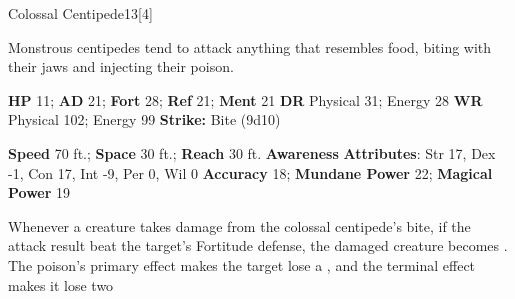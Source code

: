   
  \begin{monsection}{Colossal Centipede}{13}[4]
    \vspace{-1em}\vspace{-1em}
    \vspace{0em}

    
    Monstrous centipedes tend to attack anything that resembles food, biting with their jaws and injecting their poison.
  

    \begin{spellcontent}
      \begin{spelltargetinginfo}
        \pari \textbf{HP} 11;
          \textbf{AD} 21;
          \textbf{Fort} 28;
          \textbf{Ref} 21;
          \textbf{Ment} 21
        \pari \textbf{DR} Physical 31; Energy 28
        \pari \textbf{WR} Physical 102; Energy 99
        \pari \textbf{Strike:}
            Bite  (9d10)
      \end{spelltargetinginfo}
    \end{spellcontent}
    \begin{monsterfooter}
      \pari \textbf{Speed} 70 ft.;
        \textbf{Space} 30 ft.;
        \textbf{Reach} 30 ft.
      \pari \textbf{Awareness} 
      \pari \textbf{Attributes}:
        Str 17, Dex -1,
        Con 17, Int -9,
        Per 0, Wil 0
      \pari \textbf{Accuracy} 18;
        \textbf{Mundane Power} 22;
      \textbf{Magical Power} 19
    \end{monsterfooter}
  \end{monsection}
    Whenever a creature takes damage from the colossal centipede's bite,
      if the attack result beat the target's Fortitude defense,
      the damaged creature becomes .
    The poison's primary effect makes the target lose a , and the terminal effect makes it lose two 
  
